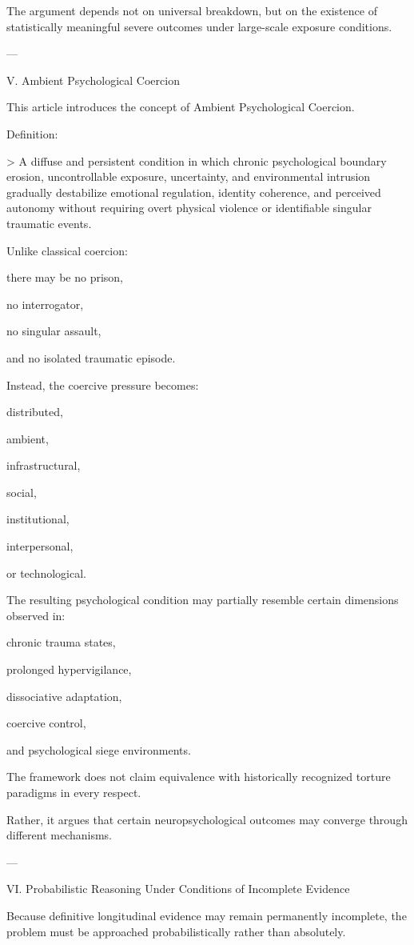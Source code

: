 The argument depends not on universal breakdown, but on the existence of statistically meaningful severe outcomes under large-scale exposure conditions.


---

V. Ambient Psychological Coercion

This article introduces the concept of Ambient Psychological Coercion.

Definition:

> A diffuse and persistent condition in which chronic psychological boundary erosion, uncontrollable exposure, uncertainty, and environmental intrusion gradually destabilize emotional regulation, identity coherence, and perceived autonomy without requiring overt physical violence or identifiable singular traumatic events.



Unlike classical coercion:

there may be no prison,

no interrogator,

no singular assault,

and no isolated traumatic episode.


Instead, the coercive pressure becomes:

distributed,

ambient,

infrastructural,

social,

institutional,

interpersonal,

or technological.


The resulting psychological condition may partially resemble certain dimensions observed in:

chronic trauma states,

prolonged hypervigilance,

dissociative adaptation,

coercive control,

and psychological siege environments.


The framework does not claim equivalence with historically recognized torture paradigms in every respect.

Rather, it argues that certain neuropsychological outcomes may converge through different mechanisms.


---

VI. Probabilistic Reasoning Under Conditions of Incomplete Evidence

Because definitive longitudinal evidence may remain permanently incomplete, the problem must be approached probabilistically rather than absolutely.

